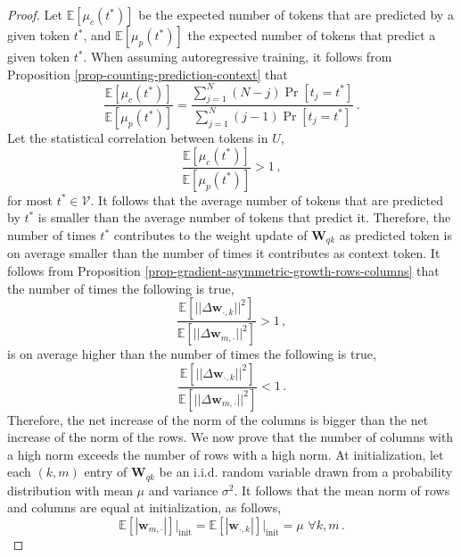 \begin{proof}
%


Let $\mathbb{E}[\mu_c(t^*)]$ be the expected number of tokens that are predicted by a given token $t^*$, and $\mathbb{E}[\mu_p(t^*)]$ the expected number of tokens that predict a given token $t^*$.
%
When assuming autoregressive training, it follows from Proposition \ref{prop-counting-prediction-context} that
%
\begin{equation}
    \frac{\mathbb{E}[\mu_c(t^*)]}{\mathbb{E}[\mu_p(t^*)]} = \frac{\sum_{j=1}^N (N-j)\Pr[t_j = t^*]}{\sum_{j=1}^N(j-1)\Pr[t_j = t^*]} \,.
\end{equation}
%
Let the statistical correlation between tokens in $U$,
%
\begin{equation}
\frac{\mathbb{E}[\mu_c(t^*)]}{\mathbb{E}[\mu_p(t^*)]} > 1\,, 
\end{equation}
%
for most $t^* \in \mathcal{V}$.
%
It follows that the average number of tokens that are predicted by $t^*$ is smaller than the average number of tokens that predict it.
%
Therefore, the number of times $t^*$ contributes to the weight update of $\bm{W}_{qk}$ as predicted token is on average smaller than the number of times it contributes as context token.
%
It follows from Proposition \ref{prop-gradient-asymmetric-growth-rows-columns} that the number of times the following is true,
%
\begin{equation}
\frac{\mathbb{E}\left[ ||\Delta \bm{w}_{\cdot, k}||^2 \right]}{\mathbb{E}\left[ ||\Delta \bm{w}_{m, \cdot}||^2 \right]} > 1 \,,
\end{equation}
%
is on average higher than the number of times the following is true,
%
\begin{equation}
\label{eq:varianceGrowthColsVsRows}
\frac{\mathbb{E}\left[ ||\Delta \bm{w}_{\cdot, k}||^2 \right]}{\mathbb{E}\left[ ||\Delta \bm{w}_{m, \cdot}||^2 \right]} < 1 \,.
\end{equation}
%
Therefore, the net increase of the norm of the columns is bigger than the net increase of the norm of the rows. 
%
We now prove that the number of columns with a high norm exceeds the number of rows with a high norm.
%
At initialization, let each $(k,m)$ entry of $\bm{W}_{qk}$ be an i.i.d. random variable drawn from a probability distribution with mean $\mu$ and variance $\sigma^2$.
%
It follows that the mean norm of rows and columns are equal at initialization, as follows,
%
\begin{equation}
\mathbb{E} \left[|\bm{w}_{m, \cdot}|\right]\bigg|_{\text{init}} = \mathbb{E} \left[|\bm{w}_{\cdot, k}|\right]\bigg|_{\text{init}} = \mu \,\, \forall k,m\,.

\end{equation}
\end{proof}
